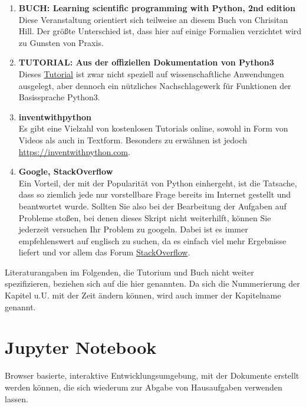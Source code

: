 \begin{enumerate}

\item \textbf{BUCH: Learning scientific programming with Python, 2nd edition} \\
Diese Veranstaltung orientiert sich teilweise an diesem Buch von Chrisitan Hill. 
Der gr\"oßte Unterschied ist, dass hier auf einige Formalien verzichtet wird zu Gunsten von Praxis.

\item \textbf{TUTORIAL: Aus der offiziellen Dokumentation von Python3} \\
Dieses \href{https://docs.python.org/3/tutorial/}{Tutorial} ist zwar nicht speziell auf wissenschaftliche Anwendungen ausgelegt, aber dennoch ein n\"utzliches Nachschlagewerk f\"ur Funktionen der Basissprache Python3.

\item \textbf{inventwithpython} \\
Es gibt eine Vielzahl von kostenlosen Tutorials online, sowohl in Form von Videos als auch in Textform.
Besonders zu erw\"ahnen ist jedoch \url{https://inventwithpython.com}.

\item \textbf{Google, StackOverflow} \\
Ein Vorteil, der mit der Popularit\"at von Python einhergeht, ist die Tatsache, dass so ziemlich jede nur vorstellbare Frage bereits im Internet gestellt und beantwortet wurde.
Sollten Sie also bei der Bearbeitung der Aufgaben auf Probleme stoßen, bei denen dieses Skript nicht weiterhilft, k\"onnen Sie jederzeit versuchen Ihr Problem zu googeln.
Dabei ist es immer empfehlenswert auf englisch zu suchen, da es einfach viel mehr Ergebnisse liefert und vor allem das Forum \href{https://stackoverflow.com}{StackOverflow}.
\end{enumerate}

Literaturangaben im Folgenden, die  Tutorium und Buch nicht weiter spezifizieren, beziehen sich auf die hier genannten. 
%
Da sich die Nummerierung der Kapitel u.U. mit der Zeit ändern können, wird auch immer der Kapitelname genannt. 



\section{Jupyter Notebook}

Browser basierte, interaktive Entwicklungsumgebung, mit der Dokumente erstellt werden können, die sich wiederum zur Abgabe von Hausaufgaben verwenden lassen.


